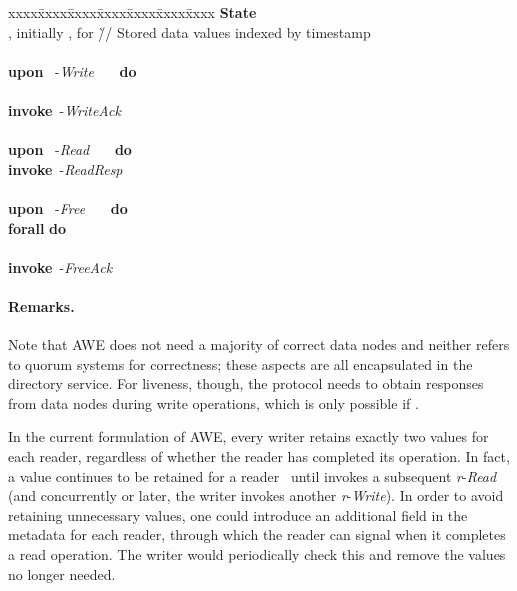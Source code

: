 \documentclass[oribibl]{llncs}
\theoremstyle{definition-boldhead}
\newcommand{\var}[1]{\textit{#1}}
\newcommand{\op}[1]{\textsl{#1}}
\newcommand{\newe}{{\bf invoke}\xspace}
\newcommand{\eventt}[3]{~{\var{#1}}-\textsl{#2}~~{#3}~}
\newcommand{\NAME}{AWE\xspace}
\newcommand{\node}{node\xspace}
\newcommand{\nodes}{nodes\xspace}
\begin{document}
\begin{alg}\small
\begin{tabbing}
  xxxx\=xxxx\=xxxx\=xxxx\=xxxx\=xxxx\=xxxx\kill
  \textbf{State} \\
  \> , initially ,
     for 
     \` // Stored data values indexed by timestamp \\
  \\
  \textbf{upon} \eventt{}{Write}{} \textbf{do} \\
  \> \\
  \> \newe \eventt{}{WriteAck}{}\\
  \\
  \textbf{upon} \eventt{}{Read}{} \textbf{do} \\
  \> \newe \eventt{}{ReadResp}{} \\
  \\
  \textbf{upon} \eventt{}{Free}{} \textbf{do}\\
  \> \textbf{forall}  \textbf{do} \\
  \> \>  \\
  \> \newe \eventt{}{FreeAck}{}
\end{tabbing}
\caption{Protocol~\NAME, implementation of data \node~.}
\label{alg:datareplica}
\end{alg}

\fi




\if\submit\no

\paragraph{Remarks.}

Note that \NAME does not need a majority of correct data \nodes and
neither refers to quorum systems for correctness; these aspects are
all encapsulated in the directory service.  For liveness, though, the
protocol needs to obtain responses from  data \nodes during write
operations, which is only possible if .

In the current formulation of \NAME, every writer retains exactly two
values for each reader, regardless of whether the reader has completed
its operation.  In fact, a value continues to be retained
for a reader~ until  invokes a subsequent \var{r}-\op{Read} (and
concurrently or later, the writer invokes another \var{r}-\op{Write}).
In order to avoid retaining unnecessary values, one could introduce an
additional field in the metadata for each reader, through which the
reader can signal when it completes a read operation.  The writer
would periodically check this and remove the values no longer needed.
\end{document}

